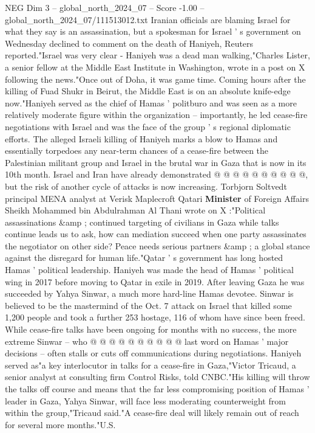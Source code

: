 \begin{textsample}{NEG Dim 3 – global\_north\_2024\_07 – Score -1.00 – global\_north\_2024\_07/111513012.txt}  \label{ex:f3_neg_370}
Iranian officials are blaming Israel for what they say is an assassination, but a spokesman for Israel ' s government on Wednesday declined to comment on the death of Haniyeh, Reuters reported."Israel was very clear - Haniyeh was a dead man walking,"Charles Lister, a senior fellow at the Middle East Institute in Washington, wrote in a post on X following the news."Once out of Doha, it was game time.
Coming hours after the killing of Fuad Shukr in Beirut, the Middle East is on an absolute knife-edge now."Haniyeh served as the chief of Hamas ' politburo and was seen as a more relatively moderate figure within the organization -- importantly, he led cease-fire negotiations with Israel and was the face of the group ' s regional diplomatic efforts.
The alleged Israeli killing of Haniyeh marks a blow to Hamas and essentially torpedoes any near-term chances of a cease-fire between the Palestinian militant group and Israel in the brutal war in Gaza that is now in its 10th month.
Israel and Iran have already demonstrated @ @ @ @ @ @ @ @ @ @, but the risk of another cycle of attacks is now increasing.
Torbjorn Soltvedt principal MENA analyst at Verisk Maplecroft Qatari \textbf{Minister} of Foreign Affairs Sheikh Mohammed bin Abdulrahman Al Thani wrote on X :"Political assassinations \&amp ; continued targeting of civilians in Gaza while talks continue leads us to ask, how can mediation succeed when one party assassinates the negotiator on other side?
Peace needs serious partners \&amp ; a global stance against the disregard for human life."Qatar ' s government has long hosted Hamas ' political leadership.
Haniyeh was made the head of Hamas ' political wing in 2017 before moving to Qatar in exile in 2019.
After leaving Gaza he was succeeded by Yahya Sinwar, a much more hard-line Hamas devotee.
Sinwar is believed to be the mastermind of the Oct. 7 attack on Israel that killed some 1,200 people and took a further 253 hostage, 116 of whom have since been freed.
While cease-fire talks have been ongoing for months with no success, the more extreme Sinwar -- who @ @ @ @ @ @ @ @ @ @ last word on Hamas ' major decisions -- often stalls or cuts off communications during negotiations.
Haniyeh served as"a key interlocutor in talks for a cease-fire in Gaza,"Victor Tricaud, a senior analyst at consulting firm Control Risks, told CNBC."His killing will throw the talks off course and means that the far less compromising position of Hamas ' leader in Gaza, Yahya Sinwar, will face less moderating counterweight from within the group,"Tricaud said."A cease-fire deal will likely remain out of reach for several more months."U.S.

\end{textsample}
